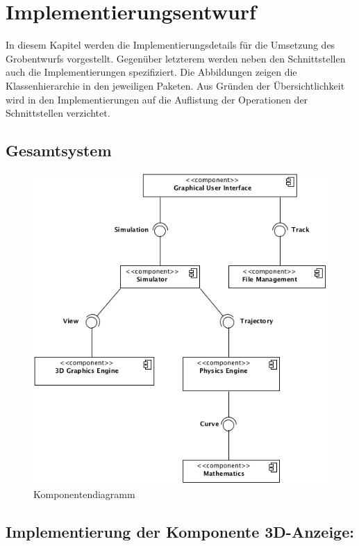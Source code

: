 \chapter{Implementierungsentwurf}

In diesem Kapitel werden die Implementierungsdetails für die Umsetzung des
Grobentwurfs vorgestellt. Gegenüber letzterem werden neben den Schnittstellen
auch die Implementierungen spezifiziert. Die Abbildungen zeigen die 
Klassenhierarchie in den jeweiligen Paketen. Aus Gründen der Übersichtlichkeit
wird in den Implementierungen auf die Auflistung der Operationen der Schnittstellen
verzichtet.

\newpage

\section{Gesamtsystem}
\begin{figure}[!h]
	\includegraphics[width=0.8\linewidth]{bilder/components.png}
\caption{Komponentendiagramm}
\end{figure}

\section{Implementierung der Komponente 3D-Anzeige:}

